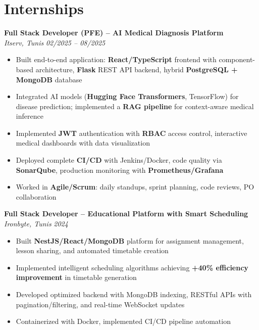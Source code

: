 \documentclass[10pt,a4paper]{article}
\begin{document}
\section*{Internships}
{\small

\textbf{Full Stack Developer (PFE) -- AI Medical Diagnosis Platform} \\[1pt]
\textit{Itserv, Tunis} \hfill \textit{02/2025 -- 08/2025}
\begin{itemize}
  \item Built end-to-end application: \textbf{React/TypeScript} frontend with component-based architecture, \textbf{Flask} REST API backend, hybrid \textbf{PostgreSQL + MongoDB} database
  \item Integrated AI models (\textbf{Hugging Face Transformers}, TensorFlow) for disease prediction; implemented a \textbf{RAG pipeline} for context-aware medical inference
  \item Implemented \textbf{JWT} authentication with \textbf{RBAC} access control, interactive medical dashboards with data visualization
  \item Deployed complete \textbf{CI/CD} with Jenkins/Docker, code quality via \textbf{SonarQube}, production monitoring with \textbf{Prometheus/Grafana}
  \item Worked in \textbf{Agile/Scrum}: daily standups, sprint planning, code reviews, PO collaboration
\end{itemize}

\vspace{4pt}
\textbf{Full Stack Developer -- Educational Platform with Smart Scheduling} \\[1pt]
\textit{Ironbyte, Tunis} \hfill \textit{2024}
\begin{itemize}
  \item Built \textbf{NestJS/React/MongoDB} platform for assignment management, lesson sharing, and automated timetable creation
  \item Implemented intelligent scheduling algorithms achieving \textbf{+40\% efficiency improvement} in timetable generation
  \item Developed optimized backend with MongoDB indexing, RESTful APIs with pagination/filtering, and real-time WebSocket updates
  \item Containerized with Docker, implemented CI/CD pipeline automation
\end{itemize}

}
\end{document}
